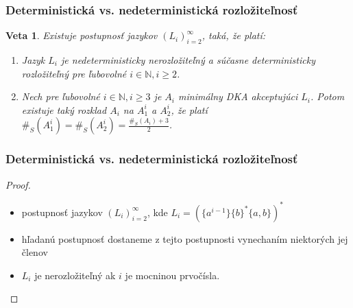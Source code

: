 \documentclass[notheorems]{beamer}
\newtheorem{theorem}{Veta}
\begin{document}
\begin{frame}
\frametitle{Deterministická vs. nedeterministická rozložiteľnosť}

\begin{theorem}
\label{thm:ndet_vs_det_diff_big}
Existuje postupnosť jazykov $  (L_i)_{i=2}^{\infty} $, taká, že platí:
\begin{enumerate}[label=(\alph*)]
\item Jazyk $ L_i $ je nedeterministicky nerozložiteľný a súčasne deterministicky rozložiteľný pre ľubovolné $ i \in \mathbb{N}, i \geq 2 $.
\item Nech pre ľubovolné $ i \in \mathbb{N}, i \geq 3 $ je $ A_i $ minimálny DKA akceptujúci $ L_i $. Potom existuje taký rozklad $ A_i $ na $ A_1^i $ a $ A_2^i $, že platí $ \#_S(A_1^i)=\#_S(A_2^i)=\frac{\#_S(A_i)+3}{2} $.
\end{enumerate}
\end{theorem}

\end{frame}

\begin{frame}
\frametitle{Deterministická vs. nedeterministická rozložiteľnosť}

\begin{proof}
\begin{itemize}
\item postupnosť jazykov $ (L_i)_{i=2}^{\infty} $, kde $ L_i = (\lbrace a^{i-1} \rbrace \lbrace b \rbrace^* \lbrace a,b \rbrace)^* $
\item hľadanú postupnosť dostaneme z tejto postupnosti vynechaním niektorých jej členov
\item $ L_i $ je nerozložiteľný ak $ i $ je mocninou prvočísla.
\end{itemize}

\begin{figure}[H]
\centering
{}
\end{figure}

\end{proof}

\end{frame}
\end{document}
